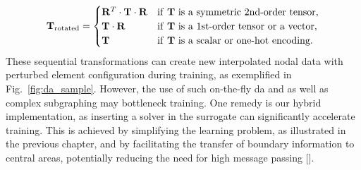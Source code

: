 \begin{equation}
\mathbf{T}_\text{rotated} = \begin{cases}
\mathbf{R}^{T} \cdot \mathbf{T} \cdot \mathbf{R} & \text{if \textbf{T} is a symmetric 2nd-order tensor}, \\
\mathbf{T} \cdot \mathbf{R} & \text{if \textbf{T} is a 1st-order tensor or a vector}, \\
\mathbf{T} & \text{if \textbf{T} is a scalar or one-hot encoding}. \\
\end{cases}
\end{equation}
%
These sequential transformations can create new interpolated nodal data with perturbed element configuration during training, as exemplified in Fig.~\ref{fig:da_sample}. However, the use of such on-the-fly \ac{da} and as well as complex subgraphing may bottleneck training. One remedy is our hybrid implementation, as inserting a solver in the surrogate can significantly accelerate training. This is achieved by simplifying the learning problem, as illustrated in the previous chapter, and by facilitating the transfer of boundary information to central areas, potentially reducing the need for high message passing [\cite{um2020}].

